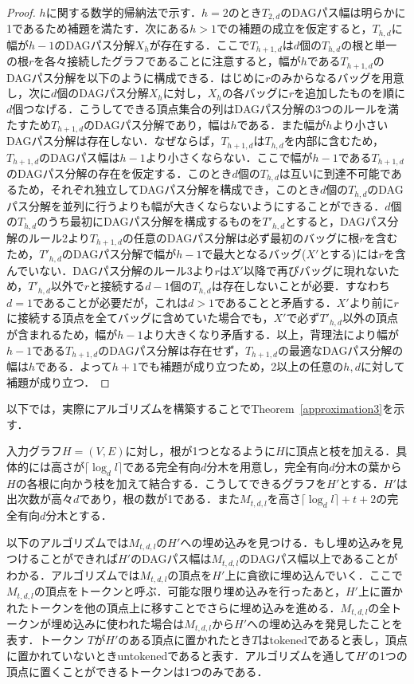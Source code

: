 \documentclass[master]{kuisthesis}		%
\theoremstyle{plain}
\theoremstyle{definition}
\begin{document}
\begin{proof}
    $h$に関する数学的帰納法で示す．$h=2$のとき$T_{2, d}$のDAGパス幅は明らかに1であるため補題を満たす．次にある$h > 1$での補題の成立を仮定すると，$T_{h, d}$に幅が$h-1$のDAGパス分解$X_h$が存在する．ここで$T_{h+1, d}$は$d$個の$T_{h, d}$の根と単一の根$r$を各々接続したグラフであることに注意すると，幅が$h$である$T_{h+1, d}$のDAGパス分解を以下のように構成できる．はじめに$r$のみからなるバッグを用意し，次に$d$個のDAGパス分解$X_h$に対し，$X_h$の各バッグに$r$を追加したものを順に$d$個つなげる．こうしてできる頂点集合の列はDAGパス分解の3つのルールを満たすため$T_{h+1, d}$のDAGパス分解であり，幅は$h$である．また幅が$h$より小さいDAGパス分解は存在しない．なぜならば，$T_{h+1, d}$は$T_{h, d}$を内部に含むため，$T_{h+1, d}$のDAGパス幅は$h-1$より小さくならない．ここで幅が$h-1$である$T_{h+1, d}$のDAGパス分解の存在を仮定する．このとき$d$個の$T_{h, d}$は互いに到達不可能であるため，それぞれ独立してDAGパス分解を構成でき，このとき$d$個の$T_{h, d}$のDAGパス分解を並列に行うよりも幅が大きくならないようにすることができる．$d$個の$T_{h, d}$のうち最初にDAGパス分解を構成するものを$T'_{h, d}$とすると，DAGパス分解のルール2より$T_{h+1, d}$の任意のDAGパス分解は必ず最初のバッグに根$r$を含むため，$T'_{h, d}$のDAGパス分解で幅が$h-1$で最大となるバッグ($X'$とする)には$r$を含んでいない．DAGパス分解のルール3より$r$は$X'$以降で再びバッグに現れないため，$T'_{h, d}$以外で$r$と接続する$d-1$個の$T_{h, d}$は存在しないことが必要．すなわち$d=1$であることが必要だが，これは$d > 1$であることと矛盾する．$X'$より前に$r$に接続する頂点を全てバッグに含めていた場合でも，$X'$で必ず$T'_{h, d}$以外の頂点が含まれるため，幅が$h-1$より大きくなり矛盾する．以上，背理法により幅が$h-1$である$T_{h+1, d}$のDAGパス分解は存在せず，$T_{h+1, d}$の最適なDAGパス分解の幅は$h$である．よって$h+1$でも補題が成り立つため，2以上の任意の$h, d$に対して補題が成り立つ．
\end{proof}


以下では，実際にアルゴリズムを構築することでTheorem~\ref{approximation3}を示す．



入力グラフ$H = (V, E)$に対し，根が1つとなるように$H$に頂点と枝を加える．具体的には高さが$\lceil \log_d l \rceil$である完全有向$d$分木を用意し，完全有向$d$分木の葉から$H$の各根に向かう枝を加えて結合する．こうしてできるグラフを$H'$とする．$H'$は出次数が高々$d$であり，根の数が1である．また$M_{t, d, l}$を高さ$\lceil \log_d l \rceil +t+2$の完全有向$d$分木とする．

以下のアルゴリズムでは$M_{t, d, l}$の$H'$への埋め込みを見つける．もし埋め込みを見つけることができれば$H'$のDAGパス幅は$M_{t, d, l}$のDAGパス幅以上であることがわかる．アルゴリズムでは$M_{t, d, l}$の頂点を$H'$上に貪欲に埋め込んでいく．ここで$M_{t, d, l}$の頂点をトークンと呼ぶ．可能な限り埋め込みを行ったあと，$H'$上に置かれたトークンを他の頂点上に移すことでさらに埋め込みを進める．$M_{t, d, l}$の全トークンが埋め込みに使われた場合は$M_{t, d, l}$から$H'$への埋め込みを発見したことを表す．トークン $T$が$H'$のある頂点に置かれたとき$T$はtokenedであると表し，頂点に置かれていないときuntokenedであると表す．アルゴリズムを通して$H'$の1つの頂点に置くことができるトークンは1つのみである．
\end{document}
